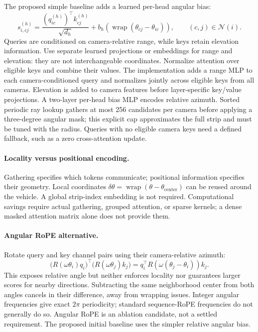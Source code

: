 \documentclass[11pt,a4paper]{article}
\begin{document}
The proposed simple baseline adds a learned per-head angular bias:
\begin{equation}
 s_{i,cj}^{(h)}=
 \frac{(q_{ic}^{(h)})^\top k_{cj}^{(h)}}{\sqrt{d_h}}
 +b_h\!\left(\operatorname{wrap}(\theta_{cj}-\theta_{ic})\right),
 \qquad(c,j)\in\mathcal N(i).
\end{equation}
Queries are conditioned on camera-relative range, while keys retain elevation information. Use separate learned projections or embeddings for range and elevation: they are not interchangeable coordinates. Normalize attention over eligible keys and combine their values. The implementation adds a range MLP to each camera-conditioned query and normalizes jointly across eligible keys from all cameras. Elevation is added to camera features before layer-specific key/value projections. A two-layer per-head bias MLP encodes relative azimuth. Sorted periodic ray lookup gathers at most 256 candidates per camera before applying a three-degree angular mask; this explicit cap approximates the full strip and must be tuned with the radius. Queries with no eligible camera keys need a defined fallback, such as a zero cross-attention update.

\paragraph{Locality versus positional encoding.}
Gathering specifies which tokens communicate; positional information specifies their geometry. Local coordinates $\delta\theta=\operatorname{wrap}(\theta-\theta_{\mathrm{center}})$ can be reused around the vehicle. A global strip-index embedding is not required. Computational savings require actual gathering, grouped attention, or sparse kernels; a dense masked attention matrix alone does not provide them.

\paragraph{Angular RoPE alternative.}
Rotate query and key channel pairs using their camera-relative azimuth:
\begin{equation}
 \bigl(R(\omega\theta_i)q_i\bigr)^\top
 \bigl(R(\omega\theta_j)k_j\bigr)
 =q_i^\top R\!\left(\omega(\theta_j-\theta_i)\right)k_j.
\end{equation}
This exposes relative angle but neither enforces locality nor guarantees larger scores for nearby directions. Subtracting the same neighborhood center from both angles cancels in their difference, away from wrapping issues. Integer angular frequencies give exact $2\pi$ periodicity; standard sequence-RoPE frequencies do not generally do so. Angular RoPE is an ablation candidate, not a settled requirement. The proposed initial baseline uses the simpler relative angular bias.
\end{document}
